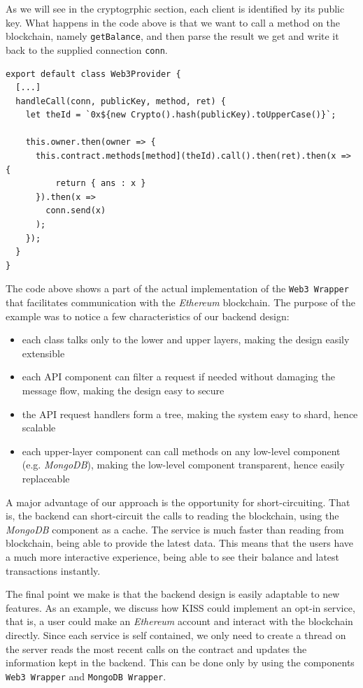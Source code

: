 \documentclass[12pt]{report}
\begin{document}
As we will see in the cryptogrphic section, each client is identified by its public key. What happens in the code above is that we want to call a method on the blockchain, namely \texttt{getBalance}, and then parse the result we get and write it back to the supplied connection \texttt{conn}.

\newpage

\begin{lstlisting}
export default class Web3Provider {
  [...]
  handleCall(conn, publicKey, method, ret) {
    let theId = `0x${new Crypto().hash(publicKey).toUpperCase()}`;

    this.owner.then(owner => {
      this.contract.methods[method](theId).call().then(ret).then(x => {
          return { ans : x }
      }).then(x =>
        conn.send(x)
      );
    });
  }
}
\end{lstlisting}

The code above shows a part of the actual implementation of the \texttt{Web3 Wrapper} that facilitates communication with the \emph{Ethereum} blockchain. The purpose of the example was to notice a few characteristics of our backend design:
\begin{itemize}
    \item each class talks only to the lower and upper layers, making the design easily extensible
    \item each API component can filter a request if needed without damaging the message flow, making the design easy to secure
    \item the API request handlers form a tree, making the system easy to shard, hence scalable
    \item each upper-layer component can call methods on any low-level component (e.g. \emph{MongoDB}), making the low-level component transparent, hence easily replaceable
\end{itemize}

A major advantage of our approach is the opportunity for short-circuiting. That is, the backend can short-circuit the calls to reading the blockchain, using the \emph{MongoDB} component as a cache. The service is much faster than reading from blockchain, being able to provide the latest data. This means that the users have a much more interactive experience, being able to see their balance and latest transactions instantly.

The final point we make is that the backend design is easily adaptable to new features. As an example, we discuss how KISS could implement an opt-in service, that is, a user could make an \emph{Ethereum} account and interact with the blockchain directly. Since each service is self contained, we only need to create a thread on the server reads the most recent calls on the contract and updates the information kept in the backend. This can be done only by using the components \texttt{Web3 Wrapper} and \texttt{MongoDB Wrapper}.
\end{document}
